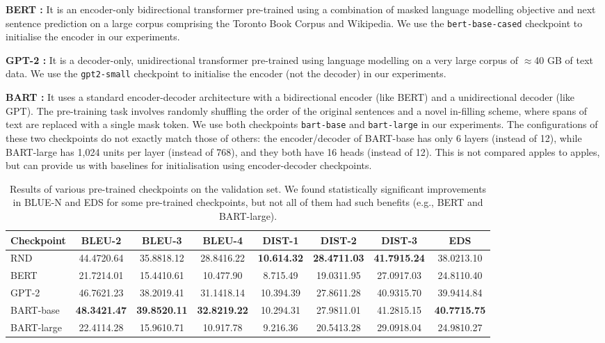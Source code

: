 \documentclass[letterpaper]{article} %
\begin{document}
\noindent
\textbf{BERT \cite{DBLP:conf/naacl/DevlinCLT19}:} It is an encoder-only bidirectional transformer pre-trained using a combination of masked language modelling objective and next sentence prediction on a large corpus comprising the Toronto Book Corpus and Wikipedia. We use the \texttt{bert-base-cased} checkpoint to initialise the encoder in our experiments.

\noindent
\textbf{GPT-2 \cite{radford2019language}:} It is a decoder-only, unidirectional transformer pre-trained using language modelling on a very large corpus of $\approx$40 GB of text data. We use the \texttt{gpt2-small} checkpoint to initialise the encoder (not the decoder) in our experiments.

\noindent
\textbf{BART \cite{DBLP:conf/acl/LewisLGGMLSZ20}:} It uses a standard encoder-decoder architecture with a bidirectional encoder (like BERT) and a unidirectional decoder (like GPT). The pre-training task involves randomly shuffling the order of the original sentences and a novel in-filling scheme, where spans of text are replaced with a single mask token. We use both checkpoints \texttt{bart-base} and \texttt{bart-large} in our experiments. The configurations of these two checkpoints do not exactly match those of others: the encoder/decoder of BART-base has only 6 layers (instead of 12), while BART-large has 1,024 units per layer (instead of 768), and they both have 16 heads (instead of 12). This is not compared apples to apples, but can provide us with baselines for initialisation using encoder-decoder checkpoints.

\begin{table}[t]
  \begin{center}
    \caption{Results of various pre-trained checkpoints on the validation set. We found statistically significant improvements in BLUE-N and EDS for some pre-trained checkpoints, but not all of them had such benefits (e.g., BERT and BART-large).}
    \begin{tabular}{l|c|c|c|c|c|c|c}
      \toprule %
      Checkpoint & BLEU-2 & BLEU-3 & BLEU-4 & DIST-1 & DIST-2 & DIST-3 & EDS\\
      \midrule %
      RND & 44.4720.64 & 35.8818.12 & 28.8416.22 & \textbf{10.614.32} & \textbf{28.4711.03} & \textbf{41.7915.24} & 38.0213.10\\
      BERT & 21.7214.01 & 15.4410.61 & 10.477.90 & 8.715.49 & 19.0311.95 & 27.0917.03 & 24.8110.40\\
      GPT-2 & 46.7621.23 & 38.2019.41 & 31.1418.14 & 10.394.39 & 27.8611.28 & 40.9315.70 & 39.9414.84\\
      BART-base & \textbf{48.3421.47} & \textbf{39.8520.11} & \textbf{32.8219.22} & 10.294.31 & 27.9811.01 & 41.2815.15 & \textbf{40.7715.75}\\
      BART-large & 22.4114.28 & 15.9610.71 & 10.917.78 & 9.216.36 & 20.5413.28 & 29.0918.04 & 24.9810.27\\
      \bottomrule %
    \end{tabular}
  \end{center}
\end{table}
\end{document}
